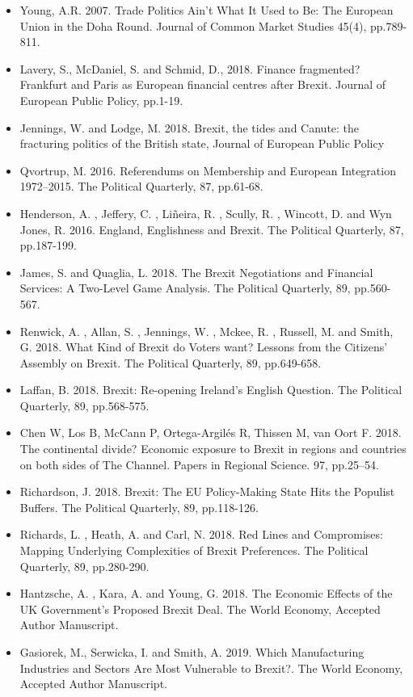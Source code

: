 \begin{itemize}
	\item Young, A.R. 2007. Trade Politics Ain’t What It Used to Be: The European Union in the Doha Round. Journal of Common Market Studies 45(4), pp.789-811.
	\item Lavery, S., McDaniel, S. and Schmid, D., 2018. Finance fragmented? Frankfurt and Paris as European financial centres after Brexit. Journal of European Public Policy, pp.1-19.
	\item Jennings, W. and Lodge, M. 2018. Brexit, the tides and Canute: the fracturing politics of the British state, Journal of European Public Policy
	\item Qvortrup, M. 2016. Referendums on Membership and European Integration 1972–2015. The Political Quarterly, 87, pp.61-68.
	\item Henderson, A. , Jeffery, C. , Liñeira, R. , Scully, R. , Wincott, D. and Wyn Jones, R. 2016. England, Englishness and Brexit. The Political Quarterly, 87, pp.187-199.
	\item James, S. and Quaglia, L. 2018. The Brexit Negotiations and Financial Services: A Two-Level Game Analysis. The Political Quarterly, 89, pp.560-567.
	\item Renwick, A. , Allan, S. , Jennings, W. , Mckee, R. , Russell, M. and Smith, G. 2018. What Kind of Brexit do Voters want? Lessons from the Citizens’ Assembly on Brexit. The Political Quarterly, 89, pp.649-658.
	\item Laffan, B. 2018. Brexit: Re-opening Ireland's English Question. The Political Quarterly, 89, pp.568-575. 
	\item Chen W, Los B, McCann P, Ortega-Argilés R, Thissen M, van Oort F. 2018. The continental divide? Economic exposure to Brexit in regions and countries on both sides of The Channel. Papers in Regional Science. 97, pp.25–54.
	\item Richardson, J. 2018. Brexit: The EU Policy-Making State Hits the Populist Buffers. The Political Quarterly, 89, pp.118-126.
	\item Richards, L. , Heath, A. and Carl, N. 2018. Red Lines and Compromises: Mapping Underlying Complexities of Brexit Preferences. The Political Quarterly, 89, pp.280-290.
	\item Hantzsche, A. , Kara, A. and Young, G. 2018. The Economic Effects of the UK Government's Proposed Brexit Deal. The World Economy, Accepted Author Manuscript.
	\item Gasiorek, M., Serwicka, I. and Smith, A. 2019. Which Manufacturing Industries and Sectors Are Most Vulnerable to Brexit?. The World Economy, Accepted Author Manuscript.

\end{itemize}
